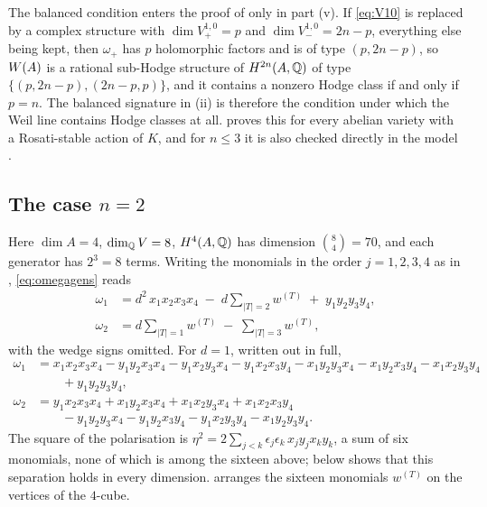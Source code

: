\begin{remark}\label{rem:balancecount}
The balanced condition enters the proof of  only in
part (v). If \eqref{eq:V10} is replaced by a complex structure with
$\dim V^{1,0}_{+}=p$ and $\dim V^{1,0}_{-}=2n-p$, everything else being kept,
then $\omega_{+}$ has $p$ holomorphic factors and is of type $(p,2n-p)$, so
$W(A)$ is a rational sub-Hodge structure of $H^{2n}(A,\mathbb{Q})$ of type
$\{(p,2n-p),(2n-p,p)\}$, and it contains a nonzero Hodge class if and only if
$p=n$. The balanced signature
in (ii) is therefore the condition under which the Weil
line contains Hodge classes at all.  proves this
for every abelian variety with a Rosati-stable action of $K$, and for $n\le3$
it is also checked directly in the model \cite{BMB26}.
\end{remark}

\subsection{The case \texorpdfstring{$n=2$}{n=2}}

Here $\dim A=4$, $\dim_{\mathbb{Q}}V=8$, $H^{4}(A,\mathbb{Q})$ has dimension
$\binom{8}{4}=70$, and each generator has $2^{3}=8$ terms. Writing the
monomials in the order $j=1,2,3,4$ as in , \eqref{eq:omegagens}
reads
\begin{align}
  \omega_{1}
  &= d^{2}\,x_{1}x_{2}x_{3}x_{4}
     \;-\;d\!\!\sum_{|T|=2}\!\!w^{(T)}
     \;+\;y_{1}y_{2}y_{3}y_{4},
     \label{eq:n2omega1}\\[2pt]
  \omega_{2}
  &= d\!\!\sum_{|T|=1}\!\!w^{(T)}
     \;-\;\sum_{|T|=3}\!\!w^{(T)} ,
     \label{eq:n2omega2}
\end{align}
with the wedge signs omitted. For $d=1$, written out in full,
\begin{align*}
  \omega_{1}
  &= x_{1}x_{2}x_{3}x_{4}
   -y_{1}y_{2}x_{3}x_{4}-y_{1}x_{2}y_{3}x_{4}-y_{1}x_{2}x_{3}y_{4}
   -x_{1}y_{2}y_{3}x_{4}-x_{1}y_{2}x_{3}y_{4}-x_{1}x_{2}y_{3}y_{4}\\
  &\qquad{}+y_{1}y_{2}y_{3}y_{4},\\
  \omega_{2}
  &= y_{1}x_{2}x_{3}x_{4}+x_{1}y_{2}x_{3}x_{4}+x_{1}x_{2}y_{3}x_{4}
     +x_{1}x_{2}x_{3}y_{4}\\
  &\qquad{}-y_{1}y_{2}y_{3}x_{4}-y_{1}y_{2}x_{3}y_{4}-y_{1}x_{2}y_{3}y_{4}
     -x_{1}y_{2}y_{3}y_{4} .
\end{align*}
The square of the polarisation is
$\eta^{2}=2\sum_{j<k}\epsilon_{j}\epsilon_{k}\,x_{j}y_{j}x_{k}y_{k}$,
a sum of six monomials, none of which is among the sixteen above;
 below shows that this separation holds in every
dimension.  arranges the sixteen monomials $w^{(T)}$ on
the vertices of the $4$-cube.

